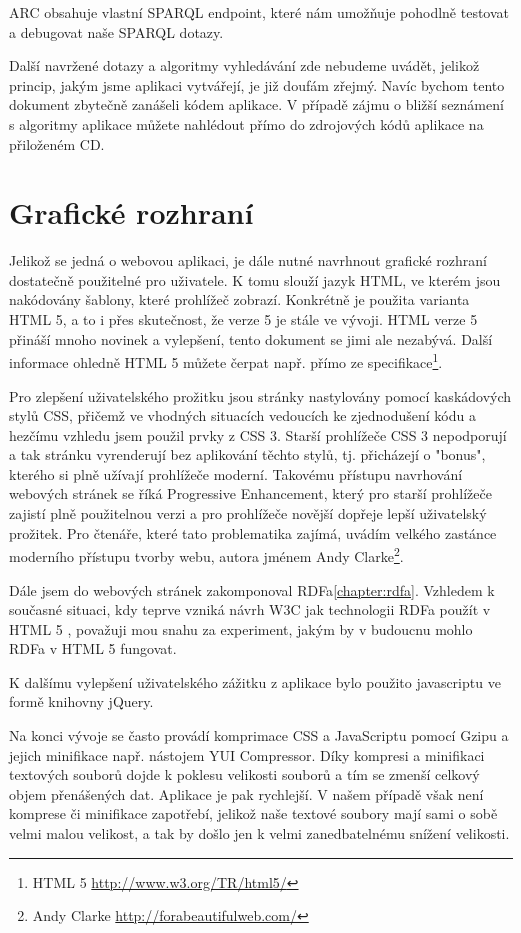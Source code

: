 ARC obsahuje vlastní SPARQL endpoint, které nám umožňuje pohodlně testovat a debugovat naše SPARQL dotazy.

Další navržené dotazy a algoritmy vyhledávání zde nebudeme uvádět, jelikož princip, jakým jsme aplikaci vytvářejí, je již doufám zřejmý. Navíc bychom tento dokument zbytečně zanášeli kódem aplikace.
V případě zájmu o bližší seznámení s algoritmy aplikace můžete nahlédout přímo do zdrojových kódů aplikace na přiloženém CD.


\section{Grafické rozhraní}

Jelikož se jedná o webovou aplikaci, je dále nutné navrhnout grafické rozhraní dostatečně použitelné pro uživatele.
K tomu slouží jazyk HTML, ve kterém jsou nakódovány šablony, které prohlížeč zobrazí.
Konkrétně je použita varianta HTML 5, a to i přes skutečnost, že verze 5 je stále ve vývoji.
HTML verze 5 přináší mnoho novinek a vylepšení, tento dokument se jimi ale nezabývá. Další informace ohledně HTML 5 můžete čerpat např. přímo ze specifikace\footnote{HTML 5 \url{http://www.w3.org/TR/html5/}}.

Pro zlepšení uživatelského prožitku jsou stránky nastylovány pomocí kaskádových stylů CSS, přičemž ve vhodných situacích vedoucích ke zjednodušení kódu a hezčímu vzhledu jsem použil prvky z CSS 3.
Starší prohlížeče CSS 3 nepodporují a tak stránku vyrenderují bez aplikování těchto stylů, tj. přicházejí o "bonus", kterého si plně užívají prohlížeče moderní.
Takovému přístupu navrhování webových stránek se říká Progressive Enhancement, který pro starší prohlížeče zajistí plně použitelnou verzi a pro prohlížeče novější dopřeje lepší uživatelský prožitek. 
Pro čtenáře, které tato problematika zajímá, uvádím velkého zastánce moderního přístupu tvorby webu, autora jménem Andy Clarke\footnote{Andy Clarke \url{http://forabeautifulweb.com/}}.

Dále jsem do webových stránek zakomponoval RDFa\ref{chapter:rdfa}.
Vzhledem k současné situaci, kdy teprve vzniká návrh W3C jak technologii RDFa použít v HTML 5 \cite{html5rdfa}, 
považuji mou snahu za experiment, jakým by v budoucnu mohlo RDFa v HTML 5 fungovat.

K dalšímu vylepšení uživatelského zážitku z aplikace bylo použito javascriptu ve formě knihovny jQuery.
   
Na konci vývoje se často provádí komprimace CSS a JavaScriptu pomocí Gzipu a jejich minifikace např. nástojem YUI Compressor.
Díky kompresi a minifikaci textových souborů dojde k poklesu velikosti souborů a tím se zmenší celkový objem přenášených dat. Aplikace je pak rychlejší.
V našem případě však není komprese či minifikace zapotřebí, jelikož naše textové soubory mají sami o sobě velmi malou velikost, 
a tak by došlo jen k velmi zanedbatelnému snížení velikosti.

